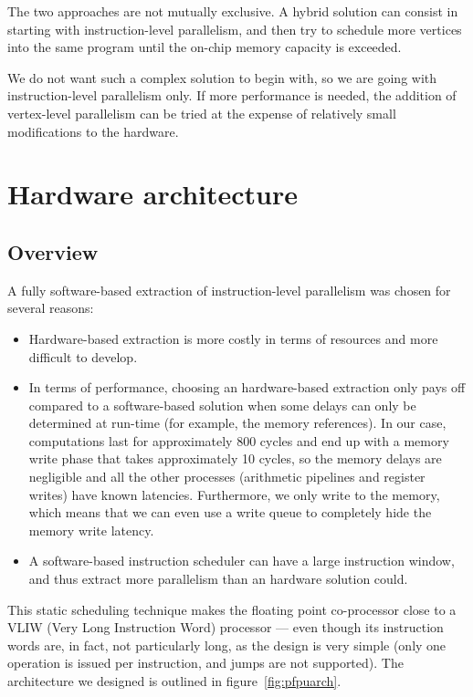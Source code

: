 \documentclass[a4paper,11pt]{kthesis}
\begin{document}
The two approaches are not mutually exclusive. A hybrid solution can consist in starting with instruction-level parallelism, and then try to schedule more vertices into the same program until the on-chip memory capacity is exceeded.

We do not want such a complex solution to begin with, so we are going with instruction-level parallelism only. If more performance is needed, the addition of vertex-level parallelism can be tried at the expense of relatively small modifications to the hardware.

\section{Hardware architecture}
\subsection{Overview}
A fully software-based extraction of instruction-level parallelism was chosen for several reasons:
\begin{itemize}
\item Hardware-based extraction is more costly in terms of resources and more difficult to develop.
\item In terms of performance, choosing an hardware-based extraction only pays off compared to a software-based solution when some delays can only be determined at run-time (for example, the memory references). In our case, computations last for approximately 800 cycles and end up with a memory write phase that takes approximately 10 cycles, so the memory delays are negligible and all the other processes (arithmetic pipelines and register writes) have known latencies. Furthermore, we only write to the memory, which means that we can even use a write queue to completely hide the memory write latency.
\item A software-based instruction scheduler can have a large instruction window, and thus extract more parallelism than an hardware solution could.
\end{itemize}

This static scheduling technique makes the floating point co-processor close to a VLIW (Very Long Instruction Word) processor --- even though its instruction words are, in fact, not particularly long, as the design is very simple (only one operation is issued per instruction, and jumps are not supported). The architecture we designed is outlined in figure~\ref{fig:pfpuarch}.
\end{document}
